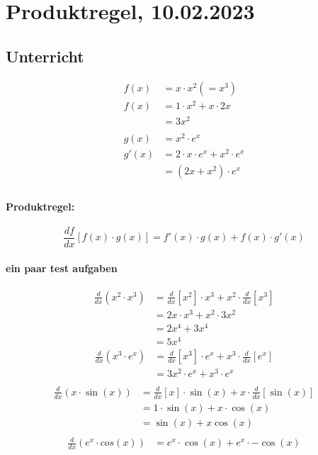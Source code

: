 \documentclass{report}
\begin{document}
\section{Produktregel, 10.02.2023}
\begin{multicols}{2}
\subsection{Unterricht}
\begin{align*}
  f(x)&=x\cdot x^2 (=x^3)\\
  f(x)&=1\cdot x^2+x\cdot 2x\\
  &=3x^2\\
  &\\
  g(x)&=x^2\cdot e^x\\
  g'(x)&=2\cdot x\cdot e^x+x^2\cdot e^x\\
  &=(2x+x^2)\cdot e^x\\
\end{align*}

\paragraph{Produktregel:}
\begin{equation}
  \frac{df}{dx}\left[f(x)\cdot g(x)\right] = f'(x)\cdot g(x)+f(x)\cdot g'(x)
\end{equation}

\paragraph{ein paar test aufgaben} %
\label{par:ein paar test aufgaben}
\begin{align*}
  \frac{d}{dx} (x^2 \cdot  x^3) &= \frac{d}{dx}\left[x^2\right]\cdot x^3+x^2\cdot \frac{d}{dx}\left[x^3\right]\\
                           &= 2x\cdot x^3 + x^2 \cdot 3x^2\\
                           &= 2x^4+3x^4\\
                           &= 5x^4
\end{align*}
\begin{align*}
  \frac{d}{dx} (x^3 \cdot  e^x) &=\frac{d}{dx}\left[x^3\right] \cdot e^x + x^3 \cdot \frac{d}{dx}\left[e^x\right]\\
  &=3x^2 \cdot e^x + x^3 \cdot e^x \\
\end{align*}
\begin{align*}
  \frac{d}{dx} (x \cdot  \sin(x)) &=\frac{d}{dx}\left[x\right]\cdot \sin(x) + x \cdot \frac{d}{dx}\left[\sin(x)\right]\\
  &=1 \cdot \sin(x) + x \cdot \cos(x)\\
  &=\sin(x)+x\cos(x)\\                           
\end{align*}
\begin{align*}
\frac{d}{dx} (e^x \cdot  cos(x)) &=e^x \cdot \cos(x)+ e^x \cdot -\cos(x) \\
\end{align*}


\end{multicols}
\end{document}
